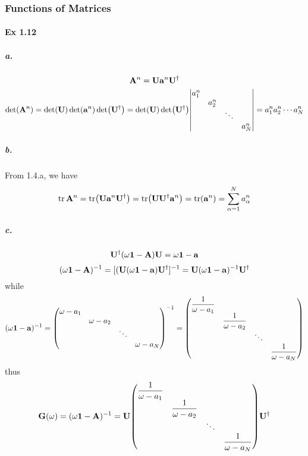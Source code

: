 \documentclass[a4paper]{article}
\newcommand{\ex}[1]{\paragraph{Ex #1}}
\newcommand{\subex}[1]{\subparagraph{#1}}
\newcommand{\iden}{{\large \bm{1}}}
\numberwithin{equation}{subsection}
\begin{document}
\subsubsection{Functions of Matrices}
\ex{1.12}
\subex{a.}
\begin{equation}\label{key}
\vb{A}^n = \vb{U}\vb{a}^n\vb{U}^\dagger
\end{equation}
\begin{equation}\label{key}
\det(\vb{A}^n) = \det(\vb{U})\det(\vb{a}^n)\det(\vb{U}^\dagger) =  \det(\vb{U})\det(\vb{U}^\dagger)
\mqty|a_1^n & & & \\
      & a_2^n & & \\
      & & \ddots & \\
      & & & a_N^n | = a_1^n a_2^n \cdots a_N^n
\end{equation}
\subex{b.}
From 1.4.a, we have
\begin{equation}\label{key}
\tr \vb{A}^n = \tr(\vb{U}\vb{a}^n\vb{U}^\dagger) = \tr(\vb{U}\vb{U}^\dagger\vb{a}^n) = \tr(\vb{a}^n) = \sum_{\alpha=1}^N a_\alpha^n
\end{equation}
\subex{c.}
\begin{equation}\label{key}
\vb{U}^\dagger(\omega\iden - \vb{A})\vb{U} = \omega\iden - \vb{a}
\end{equation}
\begin{equation}\label{key}
(\omega\iden - \vb{A})^{-1} = [(\vb{U}(\omega\iden - \vb{a})\vb{U}^\dagger]^{-1} = \vb{U}(\omega\iden - \vb{a})^{-1}\vb{U}^\dagger
\end{equation}
while
\begin{equation}\label{key}
(\omega\iden - \vb{a})^{-1} = 
\mqty(\omega-a_{1} & & & \\
      & \omega-a_{2} & & \\
      & & \ddots & \\
      & & & \omega-a_{N} )^{-1}
= \mqty(\dfrac{1}{\omega-a_{1}} & & & \\
        & \dfrac{1}{\omega-a_{2}} & & \\
        & & \ddots & \\
        & & & \dfrac{1}{\omega-a_{N}} )
\end{equation}
thus
\begin{equation}\label{key}
\vb{G}(\omega) = (\omega\iden - \vb{A})^{-1} = \vb{U}
\mqty(\dfrac{1}{\omega-a_{1}} & & & \\
& \dfrac{1}{\omega-a_{2}} & & \\
& & \ddots & \\
& & & \dfrac{1}{\omega-a_{N}} )
\vb{U}^\dagger
\end{equation}
\end{document}
